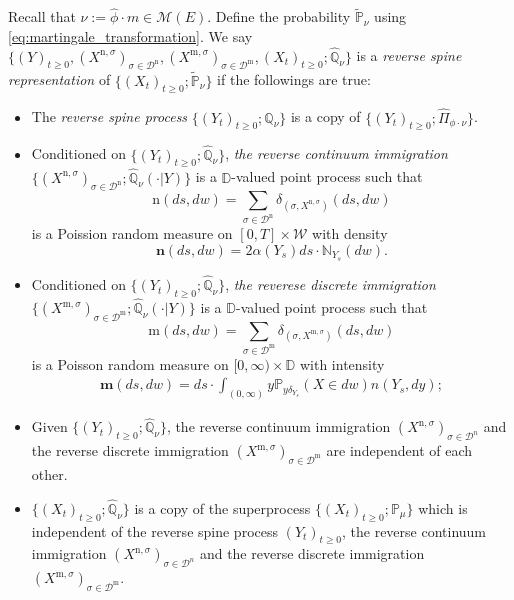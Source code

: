 \documentclass[12pt,a4paper]{amsart}
\numberwithin{equation}{section}
\theoremstyle{plain}
\theoremstyle{definition}
\begin{document}
Recall that $\nu := \widehat \phi \cdot m \in \mathcal M(E)$.
Define the probability $\widetilde {\mathbb P}_\nu$ using \eqref{eq:martingale_transformation}.
We say $\{(Y)_{t\geq 0}, (X^{\mathrm n, \sigma})_{\sigma\in \mathcal D^\mathrm n}, (X^{\mathrm m, \sigma})_{\sigma \in \mathcal D^\mathrm m}, (X_t)_{t\geq 0}; \widehat {\mathbb Q}_{\nu}\}$ is a \emph{reverse spine representation} of $\{(X_t)_{t\geq 0}; \widetilde {\mathbb P}_\nu\}$ if the followings are true:
\begin{itemize}
\item
  The \emph{reverse spine process} $\{(Y_t)_{t\geq 0}; \widehat {\mathbb Q}_\nu\}$ is a copy of $\{(Y_t)_{t\geq 0}; \widehat \Pi_{\phi\cdot\nu}\}$.
\item
  Conditioned on $\{(Y_t)_{t\geq 0}; \widehat{\mathbb Q}_\nu\}$, \emph{the reverse continuum immigration} $\{ (X^{\mathrm n,\sigma})_{\sigma \in \mathcal D^\mathrm n}; \widehat{\mathbb Q}_\nu(\cdot |Y)\}$ is a $\mathbb D$-valued point process such that
  \[
    \mathrm n(ds,dw)
    = \sum_{\sigma\in \mathcal D^{\mathrm n}} \delta_{(\sigma, X^{\mathrm n,\sigma})}(ds,dw)
  \]
	is a Poission random measure on $[0,T]\times \mathcal W$ with density
  \[
    \mathbf n(ds,dw)= 2\alpha(Y_s) ds \cdot \mathbb N_{Y_s}(dw).
  \]
\item
  Conditioned on $\{(Y_t)_{t\geq 0}; \widehat{\mathbb Q}_\nu\}$, \emph{the reverese discrete immigration} $\{(X^{\mathrm m,\sigma})_{\sigma\in \mathcal D^{\mathrm m}}; \widehat{\mathbb Q}_\nu(\cdot |Y)\}$ is a $\mathbb D$-valued point process such that
  \[
    \mathrm m(ds,dw)
    = \sum_{\sigma\in \mathcal D^{\mathrm m}} \delta_{(\sigma, X^{\mathrm m,\sigma})}(ds,dw)
  \]
	is a Poisson random measure on $[0,\infty ) \times \mathbb D$ with intensity
  \begin{align}\label{eq:meanMeasImmigr}
    \mathbf m(ds,dw)= ds \cdot \int_{(0,\infty)} y \mathbb P_{y\delta_{Y_s}}(X\in dw) n(Y_s,dy);
  \end{align}
\item
	Given $\{(Y_t)_{t\geq 0}; \widehat{\mathbb Q}_\nu\}$, the reverse continuum immigration $(X^{\mathrm n,\sigma})_{\sigma \in \mathcal D^n}$ and the reverse discrete immigration $(X^{\mathrm m,\sigma})_{\sigma\in \mathcal D^{\mathrm m}}$ are independent of each other.
\item
	$\{(X_t)_{t\geq 0}; \widehat {\mathbb Q}_\nu\}$ is a copy of the superprocess $\{(X_t)_{t\geq 0}; \mathbb P_\mu\}$ which is independent of the reverse spine process $(Y_t)_{t\geq 0}$, the reverse continuum immigration $(X^{\mathrm n,\sigma})_{\sigma \in \mathcal D^n}$ and the reverse discrete immigration $(X^{\mathrm m,\sigma})_{\sigma\in \mathcal D^{\mathrm m}}$.
\end{itemize}
\end{document}
